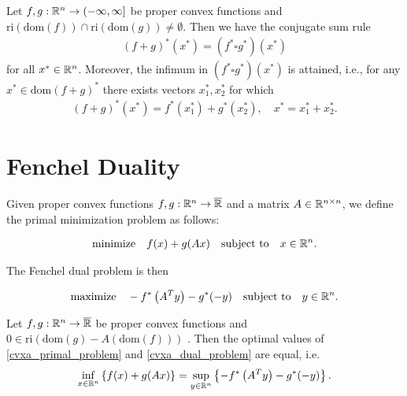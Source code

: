 \begin{theorem}
  Let
  $
    f,g:
    \mathbb{R}^n \to (-\infty, \infty]
  $
  be proper convex functions 
  and
  $
  \text{ri}\left( \text{dom}(f) \right)
  \cap
  \text{ri}\left( \text{dom}(g) \right)
  \neq 
  \emptyset
  .
  $
  Then we have the conjugate sum rule
  \begin{gather}
    ( f + g )^*(x^*)
    =
    ( f^* \square g^*)(x^*)
  \end{gather}
  for all $x^* \in \mathbb{R}^n$.
  Moreover, the infimum in 
  $
    ( f^* \square g^*)(x^*)
  $
  is attained, i.e., for any
  $
    x^* \in \text{dom}(f+g)^*
  $
  there exists vectors $x_1^*, x_2^*$
  for which
  \begin{gather}
    (f+g)^*(x^*)
    =
    f^*(x_1^*)
    +
    g^*(x_2^*),
    \quad
    x^* = x_1^* + x_2^*.
  \end{gather}
\end{theorem}


\section{Fenchel Duality}


Given 
proper convex functions $f, g : \mathbb{R}^n \to \overline{\mathbb{R}}$ 
and
a matrix $A \in \mathbb{R}^{n \times n}$,
we define 
the primal minimization problem as follows:

\begin{gather}
  \label{cvxa_primal_problem}
  \text{minimize}
  \quad
  f(x) + g(Ax) 
  \quad
  \text{subject to}
  \quad
  x \in \mathbb{R}^n.
\end{gather}

The Fenchel dual problem is then

\begin{gather}
  \label{cvxa_dual_problem}
  \text{maximize}
  \quad
  -f^* \left( A^T y \right) - g^*(-y) 
  \quad
  \text{subject to}
  \quad
  y \in \mathbb{R}^n.
\end{gather}

\begin{theorem}
  \label{cvxa_fenchel_theorem}
  Let 
  $f, g : \mathbb{R}^n \to \overline{\mathbb{R}}$ 
  be proper convex functions
  and
  $0 \in \text{ri}(\text{dom}(g) - A (\text{dom}(f)) )$
  .
  Then the optimal values of \eqref{cvxa_primal_problem} and \eqref{cvxa_dual_problem} are equal, 
  i.e.
  \begin{gather}
    \inf_{x \in \mathbb{R}^n} 
    \left\{ f(x) + g(Ax) \right\}
    =
    \sup_{y \in \mathbb{R}^n} \left\{   -f^* \left( A^T y \right) - g^*(-y) \right\}
    .
  \end{gather}
\end{theorem}
